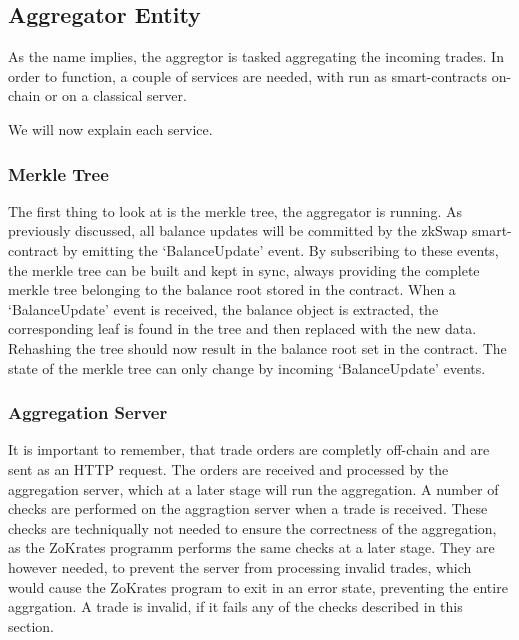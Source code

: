 \documentclass[../../thesis.tex]{subfiles}
\begin{document}






\subsection{Aggregator Entity} \label{aggregator}
As the name implies, the aggregtor is tasked aggregating the incoming trades. In order to function, a couple of services are needed, with run as smart-contracts on-chain or on a classical server. 

We will now explain each service.

\subsubsection{Merkle Tree}
The first thing to look at is the merkle tree, the aggregator is running. As previously discussed, all balance updates will be committed by the zkSwap smart-contract by emitting the `BalanceUpdate' event. By subscribing to these events, the merkle tree can be built and kept in sync, always providing the complete merkle tree belonging to the balance root stored in the contract. When a `BalanceUpdate' event is received, the balance object is extracted, the corresponding leaf is found in the tree and then replaced with the new data. Rehashing the tree should now result in the balance root set in the contract. The state of the merkle tree can only change by incoming `BalanceUpdate' events. 

\subsubsection{Aggregation Server} \label{aggregation_server}
It is important to remember, that trade orders are completly off-chain and are sent as an HTTP request. The orders are received and processed by the aggregation server, which at a later stage will run the aggregation. A number of checks are performed on the aggragtion server when a trade is received. These checks are techniqually not needed to ensure the correctness of the aggregation, as the ZoKrates programm performs the same checks at a later stage. They are however needed, to prevent the server from processing invalid trades, which would cause the ZoKrates program to exit in an error state, preventing the entire aggrgation. A trade is invalid, if it fails any of the checks described in this section.
\end{document}
